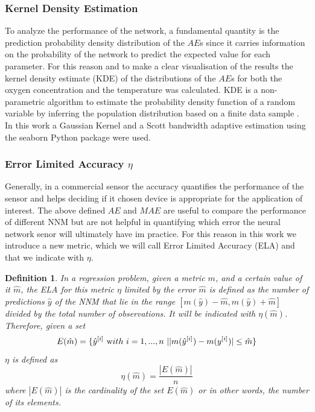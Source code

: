 \documentclass[9pt,twocolumn,twoside,pdftex]{optica}
\newtheorem*{definition*}{Definition}
\begin{document}
\subsubsection{Kernel Density Estimation}

To analyze the performance of the network, a fundamental quantity is the prediction probability density distribution of the $AE$s since it carries information on the probability of the network to predict the expected value for each parameter. For this reason and to make a clear visualisation of the results the  kernel density estimate (KDE) of the distributions of the $AE$s for both the oxygen concentration and the temperature was calculated. KDE is a non-parametric algorithm to estimate the probability density function of a random variable by inferring the population distribution based on a finite data sample \cite{Hastie2009}. 
In this work a Gaussian Kernel and a Scott bandwidth adaptive estimation \cite{Sain1996} using the seaborn Python package \cite{Waskom2020} were used.


\subsubsection{Error Limited Accuracy $\eta$}
\label{sektion:ela}

Generally, in a commercial sensor the accuracy quantifies the performance of the sensor and helps deciding if it chosen device is appropriate for the application of interest. The above defined $AE$ and $MAE$ are useful to compare the performance of different NNM but are not helpful in quantifying which error the neural network senor will ultimately have im practice.
For this reason in this work we introduce a new metric, which we will call Error Limited Accuracy (ELA) and that we indicate with $\eta$.

\begin{definition*}
In a regression problem, given a metric $m$, and a certain value of it $\hat m$, the ELA for this metric $\eta$ limited by the error $\hat m$ is defined as the number of predictions $\hat y$ of the NNM that lie in the range $[m(\hat y)-\hat m, m(\hat y)+\hat m]$ divided by the total number of observations. It will be indicated with $\eta(\hat m)$. Therefore, given a set
\begin{equation}
E(\hat m) = \{ \hat y^{[i]} \ {\text with } \ i = 1,..., n\ | |m(\hat y^{[i]})-m(y^{[i]})|\leq \hat m \} 
\end{equation}
$\eta$ is defined as
\begin{equation}
\eta(\hat m) = \frac{|E(\hat m)|}{n}
\end{equation}
where $|E(\hat m)|$ is the cardinality of the set $E(\hat m)$ or in other words, the number of its elements.
\end{definition*}
\end{document}
